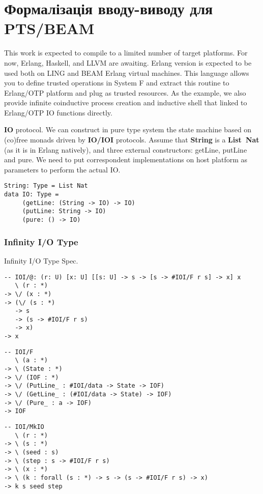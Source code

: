 \newpage
\section{Формалізація вводу-виводу для PTS/BEAM}

This work is expected to compile to a limited number of target platforms.
For now, Erlang, Haskell, and LLVM are awaiting.
Erlang version is expected to be used both on LING and BEAM Erlang virtual machines.
This language allows you to define trusted operations in System F and extract this routine to Erlang/OTP platform and plug as trusted resources.
As the example, we also provide infinite coinductive process creation and inductive shell that linked to Erlang/OTP IO functions directly.

{\bf IO} protocol.
We can construct in pure type system the state machine based on (co)free monads driven by {\bf IO/IOI} protocols.
Assume that {\bf String} is a {\bf List\ Nat} (as it is in Erlang natively), and three external constructors: getLine, putLine and pure.
We need to put correspondent implementations on host platform as parameters to perform the actual IO.

\begin{lstlisting}
String: Type = List Nat
data IO: Type =
     (getLine: (String -> IO) -> IO)
     (putLine: String -> IO)
     (pure: () -> IO)
\end{lstlisting}

\subsubsection{Infinity I/O Type}

Infinity I/O Type Spec.

\begin{lstlisting}
-- IOI/@: (r: U) [x: U] [[s: U] -> s -> [s -> #IOI/F r s] -> x] x
   \ (r : *)
-> \/ (x : *)
-> (\/ (s : *)
   -> s
   -> (s -> #IOI/F r s)
   -> x)
-> x
\end{lstlisting}

\begin{lstlisting}
-- IOI/F
   \ (a : *)
-> \ (State : *)
-> \/ (IOF : *)
-> \/ (PutLine_ : #IOI/data -> State -> IOF)
-> \/ (GetLine_ : (#IOI/data -> State) -> IOF)
-> \/ (Pure_ : a -> IOF)
-> IOF
\end{lstlisting}

\begin{lstlisting}
-- IOI/MkIO
   \ (r : *)
-> \ (s : *)
-> \ (seed : s)
-> \ (step : s -> #IOI/F r s)
-> \ (x : *)
-> \ (k : forall (s : *) -> s -> (s -> #IOI/F r s) -> x)
-> k s seed step
\end{lstlisting}

